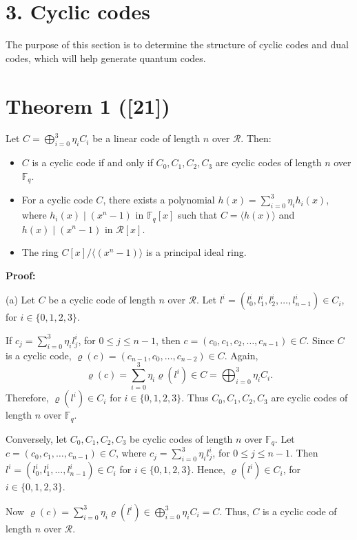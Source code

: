 \documentclass[12pt]{article}
\begin{document}
\section*{3. Cyclic codes}
The purpose of this section is to determine the structure of cyclic codes and dual codes, which will help generate quantum codes.

\section*{Theorem 1 ([21])}
Let $C = \bigoplus\limits_{i=0}^3 \eta_i C_i$ be a linear code of length $n$ over $\mathcal{R}$. Then:

\begin{itemize}
    \item[(a)] $C$ is a cyclic code if and only if $C_0, C_1, C_2, C_3$ are cyclic codes of length $n$ over $\mathbb{F}_q$.
    \item[(b)] For a cyclic code $C$, there exists a polynomial $h(x) = \sum\limits_{i=0}^3 \eta_i h_i(x)$, where $h_i(x) \mid (x^n - 1)$ in $\mathbb{F}_q[x]$ such that $C = \langle h(x) \rangle$ and $h(x) \mid (x^n - 1)$ in $\mathcal{R}[x]$.
    \item[(c)] The ring $C[x]/\langle (x^n - 1) \rangle$ is a principal ideal ring.
\end{itemize}

\textbf{Proof:}

(a) Let $C$ be a cyclic code of length $n$ over $\mathcal{R}$. Let $l^i = (l^i_0, l^i_1, l^i_2, \dots, l^i_{n-1}) \in C_i$, for $i \in \{0, 1, 2, 3\}$.

If $c_j = \sum\limits_{i=0}^3 \eta_i l^i_j$, for $0 \leq j \leq n-1$, then $c = (c_0, c_1, c_2, \dots, c_{n-1}) \in C$. Since $C$ is a cyclic code, $\varrho(c) = (c_{n-1}, c_0, \dots, c_{n-2}) \in C$. Again,
\[
\varrho(c) = \sum_{i=0}^3 \eta_i \varrho(l^i) \in C = \bigoplus_{i=0}^3 \eta_i C_i.
\]
Therefore, $\varrho(l^i) \in C_i$ for $i \in \{0, 1, 2, 3\}$. Thus $C_0, C_1, C_2, C_3$ are cyclic codes of length $n$ over $\mathbb{F}_q$.

Conversely, let $C_0, C_1, C_2, C_3$ be cyclic codes of length $n$ over $\mathbb{F}_q$. Let $c = (c_0, c_1, \dots, c_{n-1}) \in C$, where $c_j = \sum\limits_{i=0}^3 \eta_i l^i_j$, for $0 \leq j \leq n-1$. Then $l^i = (l^i_0, l^i_1, \dots, l^i_{n-1}) \in C_i$ for $i \in \{0, 1, 2, 3\}$. Hence, $\varrho(l^i) \in C_i$, for $i \in \{0, 1, 2, 3\}$.

Now $\varrho(c) = \sum\limits_{i=0}^3 \eta_i \varrho(l^i) \in \bigoplus\limits_{i=0}^3 \eta_i C_i = C$. Thus, $C$ is a cyclic code of length $n$ over $\mathcal{R}$.
\end{document}
